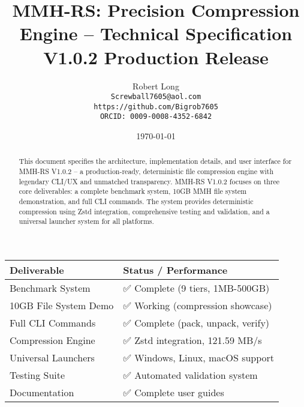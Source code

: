 \documentclass[11pt,a4paper]{article}
\title{MMH-RS: Precision Compression Engine -- Technical Specification\\[1ex]\textbf{\large V1.0.2 Production Release}}
\author{Robert Long \\ \texttt{Screwball7605@aol.com} \\ \texttt{https://github.com/Bigrob7605} \\ \texttt{ORCID: 0009-0008-4352-6842}}
\date{\today}
\begin{document}
	\maketitle
	\thispagestyle{empty}
	\begin{abstract}
		This document specifies the architecture, implementation details, and user interface for MMH-RS V1.0.2 -- a production-ready, deterministic file compression engine with legendary CLI/UX and unmatched transparency. MMH-RS V1.0.2 focuses on three core deliverables: a complete benchmark system, 10GB MMH file system demonstration, and full CLI commands. The system provides deterministic compression using Zstd integration, comprehensive testing and validation, and a universal launcher system for all platforms.
	\end{abstract}

	\begin{center}
	\begin{tcolorbox}[colback=gray!5, colframe=gray!60, boxrule=0.7pt, arc=2pt, title=\textbf{\large MMH-RS V1.0.2 Core Deliverables}]
	\begin{tabular}{@{}ll@{}}
	\toprule
	\textbf{Deliverable} & \textbf{Status / Performance} \\
	\midrule
	Benchmark System     & ✅ Complete (9 tiers, 1MB-500GB) \\
	10GB File System Demo & ✅ Working (compression showcase) \\
	Full CLI Commands    & ✅ Complete (pack, unpack, verify) \\
	Compression Engine   & ✅ Zstd integration, 121.59 MB/s \\
	Universal Launchers  & ✅ Windows, Linux, macOS support \\
	Testing Suite        & ✅ Automated validation system \\
	Documentation        & ✅ Complete user guides \\
	\bottomrule
	\end{tabular}
	\end{tcolorbox}
	\end{center}
\end{document}
